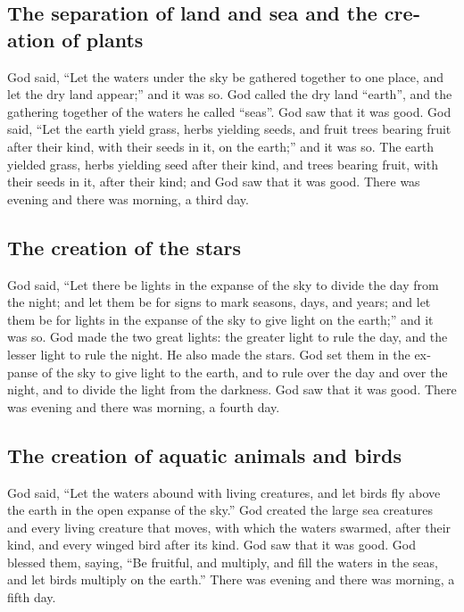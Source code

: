 \begin{paracol}{2}
\begin{otherlanguage}{english}
\hypertarget{the-separation-of-land-and-sea-and-the-creation-of-plants}{%
\subsection{The separation of land and sea and the creation of
plants}\label{the-separation-of-land-and-sea-and-the-creation-of-plants}}

 God said, ``Let the waters under the sky be gathered
together to one place, and let the dry land appear;'' and it was so.
 God called the dry land ``earth'', and the gathering
together of the waters he called ``seas''. God saw that it was good.
 God said, ``Let the earth yield grass, herbs yielding
seeds, and fruit trees bearing fruit after their kind, with their seeds
in it, on the earth;'' and it was so.  The earth yielded
grass, herbs yielding seed after their kind, and trees bearing fruit,
with their seeds in it, after their kind; and God saw that it was good.
 There was evening and there was morning, a third day.

\hypertarget{the-creation-of-the-stars}{%
\subsection{The creation of the stars}\label{the-creation-of-the-stars}}

 God said, ``Let there be lights in the expanse of the
sky to divide the day from the night; and let them be for signs to mark
seasons, days, and years;  and let them be for lights in
the expanse of the sky to give light on the earth;'' and it was so.
 God made the two great lights: the greater light to rule
the day, and the lesser light to rule the night. He also made the stars.
 God set them in the expanse of the sky to give light to
the earth,  and to rule over the day and over the night,
and to divide the light from the darkness. God saw that it was good.
 There was evening and there was morning, a fourth day.

\hypertarget{the-creation-of-aquatic-animals-and-birds}{%
\subsection{The creation of aquatic animals and
birds}\label{the-creation-of-aquatic-animals-and-birds}}

 God said, ``Let the waters abound with living creatures,
and let birds fly above the earth in the open expanse of the sky.''
 God created the large sea creatures and every living
creature that moves, with which the waters swarmed, after their kind,
and every winged bird after its kind. God saw that it was good.
 God blessed them, saying, ``Be fruitful, and multiply,
and fill the waters in the seas, and let birds multiply on the earth.''
 There was evening and there was morning, a fifth day.


\end{otherlanguage}
\end{paracol}
